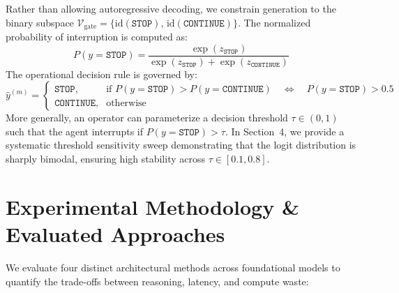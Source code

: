 \documentclass{article}
\begin{document}
Rather than allowing autoregressive decoding, we constrain generation to the binary subspace $\mathcal{V}_{\text{gate}} = \{ \text{id}(\texttt{STOP}), \, \text{id}(\texttt{CONTINUE}) \}$. The normalized probability of interruption is computed as:
\begin{equation}
P(y = \texttt{STOP}) = \frac{\exp(z_{\texttt{STOP}})}{\exp(z_{\texttt{STOP}}) + \exp(z_{\texttt{CONTINUE}})}
\end{equation}
The operational decision rule is governed by:
\begin{equation}
\hat{y}^{(m)} = \begin{cases} 
\texttt{STOP}, & \text{if } P(y = \texttt{STOP}) > P(y = \texttt{CONTINUE}) \quad \iff \quad P(y = \texttt{STOP}) > 0.5 \\
\texttt{CONTINUE}, & \text{otherwise}
\end{cases}
\label{eq:decision_rule}
\end{equation}
More generally, an operator can parameterize a decision threshold $\tau \in (0, 1)$ such that the agent interrupts if $P(y = \texttt{STOP}) > \tau$. In Section~4, we provide a systematic threshold sensitivity sweep demonstrating that the logit distribution is sharply bimodal, ensuring high stability across $\tau \in [0.1, 0.8]$.

\section{Experimental Methodology \& Evaluated Approaches}

We evaluate four distinct architectural methods across foundational models to quantify the trade-offs between reasoning, latency, and compute waste:
\end{document}
